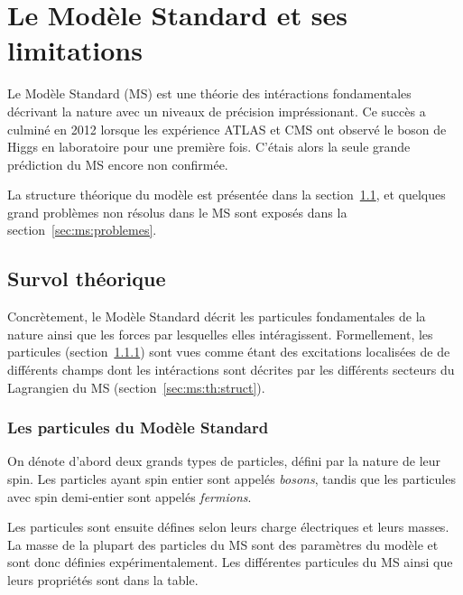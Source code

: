 \section{Le Modèle Standard et ses limitations}
\label{sec:ms}

Le Modèle Standard (MS) est une théorie des intéractions fondamentales
décrivant la nature avec un niveaux de précision impréssionant. Ce
succès a culminé en 2012 lorsque les expérience ATLAS et CMS ont
observé le boson de Higgs en laboratoire pour une première
fois. C'étais alors la seule grande prédiction du MS encore non
confirmée. 

La structure théorique du modèle est présentée dans la
section~\ref{sec:ms:th}, et quelques grand problèmes non résolus dans
le MS sont exposés dans la section~\ref{sec:ms:problemes}.

\subsection{Survol théorique}
\label{sec:ms:th}

Concrètement, le Modèle Standard décrit les particules fondamentales
de la nature ainsi que les forces par lesquelles elles
intéragissent. Formellement, les particules
(section~\ref{sec:ms:th:particules}) sont vues comme étant des
excitations localisées de de différents champs dont les intéractions
sont décrites par les différents secteurs du Lagrangien du MS
(section~\ref{sec:ms:th:struct}).

\subsubsection{Les particules du Modèle Standard}
\label{sec:ms:th:particules}

On dénote d'abord deux grands types de particles, défini par la nature
de leur spin. Les particles ayant spin entier sont appelés
\emph{bosons}, tandis que les particules avec spin demi-entier sont
appelés \emph{fermions}.

Les particules sont ensuite défines selon leurs charge électriques et
leurs masses. La masse de la plupart des particles du MS sont des
paramètres du modèle et sont donc définies expérimentalement. Les
différentes particules du MS ainsi que leurs propriétés sont dans la table.

